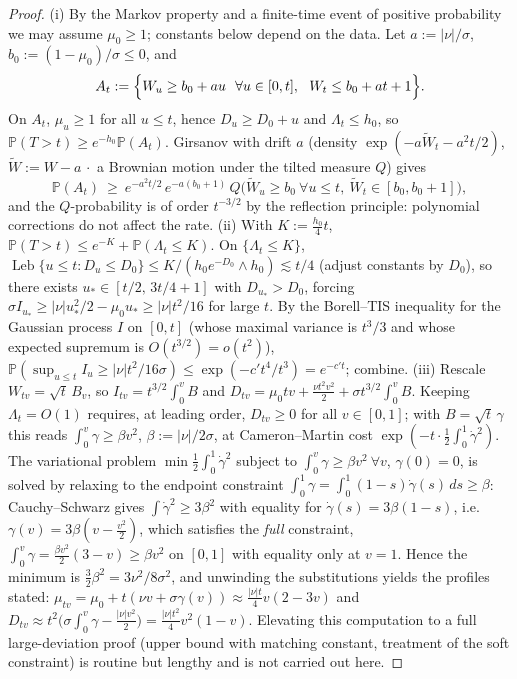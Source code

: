 \documentclass[11pt]{article}
\numberwithin{equation}{section}
\theoremstyle{plain}
\theoremstyle{definition}
\theoremstyle{remark}
\newcommand{\PP}{\mathbb{P}}
\DeclareMathOperator{\Leb}{Leb}
\begin{document}
\begin{proof}
(i) By the Markov property and a finite-time event of positive probability
we may assume $\mu_0\ge1$; constants below depend on the data. Let
$a:=|\nu|/\sigma$, $b_0:=(1-\mu_0)/\sigma\le0$, and
\[
A_t:=\Bigl\{W_u\ge b_0+au\ \ \forall u\in[0,t],\ \ W_t\le b_0+at+1\Bigr\}.
\]
On $A_t$, $\mu_u\ge1$ for all $u\le t$, hence $D_u\ge D_0+u$ and
$\Lambda_t\le h_0$, so $\PP(T>t)\ge e^{-h_0}\PP(A_t)$. Girsanov with drift
$a$ (density $\exp(-a\widetilde W_t-a^2t/2)$, $\widetilde W:=W-a\,\cdot$
a Brownian motion under the tilted measure $Q$) gives
\[
\PP(A_t)\ \ge\ e^{-a^2t/2}\,e^{-a(b_0+1)}\,
Q\bigl(\widetilde W_u\ge b_0\ \forall u\le t,\ \widetilde W_t\in[b_0,b_0+1]
\bigr),
\]
and the $Q$-probability is of order $t^{-3/2}$ by the reflection
principle: polynomial corrections do not affect the rate.
(ii) With $K:=\tfrac{h_0}4t$,
$\PP(T>t)\le e^{-K}+\PP(\Lambda_t\le K)$. On $\{\Lambda_t\le K\}$,
$\Leb\{u\le t:D_u\le D_0\}\le K/(h_0e^{-D_0}\wedge h_0)\lesssim t/4$ (adjust
constants by $D_0$), so there exists
$u_*\in[t/2,\,3t/4+1]$ with $D_{u_*}>D_0$, forcing
$\sigma I_{u_*}\ge|\nu|u_*^2/2-\mu_0u_*\ge|\nu|t^2/16$ for large $t$. By
the Borell--TIS inequality for the Gaussian process $I$ on $[0,t]$ (whose
maximal variance is $t^3/3$ and whose expected supremum is
$O(t^{3/2})=o(t^2)$),
$\PP(\sup_{u\le t}I_u\ge|\nu|t^2/16\sigma)\le
\exp(-c't^4/t^3)=e^{-c't}$; combine.
(iii) Rescale $W_{tv}=\sqrt t\,B_v$, so
$I_{tv}=t^{3/2}\int_0^vB$ and
$D_{tv}=\mu_0tv+\tfrac{\nu t^2v^2}2+\sigma t^{3/2}\!\int_0^vB$. Keeping
$\Lambda_t=O(1)$ requires, at leading order, $D_{tv}\ge0$ for all
$v\in[0,1]$; with $B=\sqrt t\,\gamma$ this reads
$\int_0^v\gamma\ge\beta v^2$, $\beta:=|\nu|/2\sigma$, at
Cameron--Martin cost $\exp(-t\cdot\tfrac12\int_0^1\dot\gamma^2)$. The
variational problem
$\min\tfrac12\int_0^1\dot\gamma^2$ subject to
$\int_0^v\gamma\ge\beta v^2\ \forall v$, $\gamma(0)=0$, is solved by
relaxing to the endpoint constraint
$\int_0^1\gamma=\int_0^1(1-s)\dot\gamma(s)\,ds\ge\beta$: Cauchy--Schwarz
gives $\int\dot\gamma^2\ge3\beta^2$ with equality for
$\dot\gamma(s)=3\beta(1-s)$, i.e.\ $\gamma(v)=3\beta(v-\tfrac{v^2}2)$,
which satisfies the \emph{full} constraint,
$\int_0^v\gamma=\tfrac{\beta v^2}2(3-v)\ge\beta v^2$ on $[0,1]$ with
equality only at $v=1$. Hence the minimum is $\tfrac32\beta^2
=3\nu^2/8\sigma^2$, and unwinding the substitutions yields the profiles
stated: $\mu_{tv}=\mu_0+t(\nu v+\sigma\gamma(v))
\approx\tfrac{|\nu|t}4v(2-3v)$ and
$D_{tv}\approx t^2\bigl(\sigma\int_0^v\gamma-\tfrac{|\nu|v^2}2\bigr)
=\tfrac{|\nu|t^2}4v^2(1-v)$. Elevating this computation to a full
large-deviation proof (upper bound with matching constant, treatment of the
soft constraint) is routine but lengthy and is not carried out here.
\end{proof}
\end{document}
